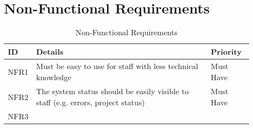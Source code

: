 \section{Non-Functional Requirements}
\label{requirements:non-functional}
\begin{center}
    \begin{table}[H]
        \begin{tabular}{l l l}
            \hline
            \textbf{ID}             & \textbf{Details}
                                    & \textbf{Priority}
            \\ \hline
            NFR1                    & Must be easy to use for staff with less technical
            knowledge
                                    & Must Have
            \\ \hline
            NFR2                    & The system status should be easily visible to staff (e.g.
            errors, project status) & Must Have                                                 \\ \hline
            NFR3
        \end{tabular}
        \caption{Non-Functional Requirements}
    \end{table}
\end{center}